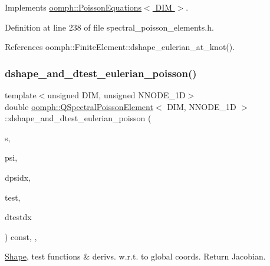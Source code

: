 Implements \hyperlink{classoomph_1_1PoissonEquations_a09f816da9c9b23fd6a308601fe536cef}{oomph\+::\+Poisson\+Equations$<$ D\+I\+M $>$}.



Definition at line 238 of file spectral\+\_\+poisson\+\_\+elements.\+h.



References oomph\+::\+Finite\+Element\+::dshape\+\_\+eulerian\+\_\+at\+\_\+knot().

\mbox{\label{classoomph_1_1QSpectralPoissonElement_ab2600e7f60d8a8c4b5c32109e9174e8f}} 
\subsubsection{\texorpdfstring{dshape\+\_\+and\+\_\+dtest\+\_\+eulerian\+\_\+poisson()}{dshape\_and\_dtest\_eulerian\_poisson()}}
{\footnotesize\ttfamily template$<$unsigned D\+IM, unsigned N\+N\+O\+D\+E\+\_\+1D$>$ \\
double \hyperlink{classoomph_1_1QSpectralPoissonElement}{oomph\+::\+Q\+Spectral\+Poisson\+Element}$<$ D\+IM, N\+N\+O\+D\+E\+\_\+1D $>$\+::dshape\+\_\+and\+\_\+dtest\+\_\+eulerian\+\_\+poisson (\begin{DoxyParamCaption}\item[{const \hyperlink{classoomph_1_1Vector}{Vector}$<$ double $>$ \&}]{s,  }\item[{\hyperlink{classoomph_1_1Shape}{Shape} \&}]{psi,  }\item[{\hyperlink{classoomph_1_1DShape}{D\+Shape} \&}]{dpsidx,  }\item[{\hyperlink{classoomph_1_1Shape}{Shape} \&}]{test,  }\item[{\hyperlink{classoomph_1_1DShape}{D\+Shape} \&}]{dtestdx }\end{DoxyParamCaption}) const\hspace{0.3cm}{\ttfamily [inline]}, {\ttfamily [protected]}, {\ttfamily [virtual]}}



\hyperlink{classoomph_1_1Shape}{Shape}, test functions \& derivs. w.\+r.\+t. to global coords. Return Jacobian. 

